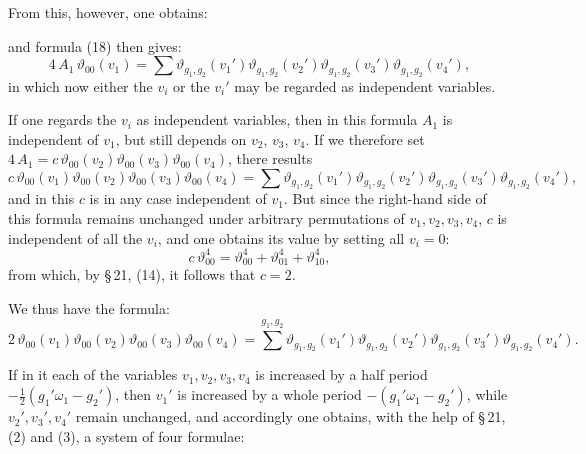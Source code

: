 
From this, however, one obtains:


and formula (18) then gives:
\[
4\,A_1\,\vartheta_{00}(v_1) = \sum \vartheta_{g_1,g_2}(v_1')\vartheta_{g_1,g_2}(v_2')\vartheta_{g_1,g_2}(v_3')\vartheta_{g_1,g_2}(v_4'),
\]
in which now either the $v_i$ or the $v_i'$ may be regarded as independent variables.

If one regards the $v_i$ as independent variables, then in this formula $A_1$ is independent of $v_1$, but still depends on $v_2$, $v_3$, $v_4$. If we therefore set $4\,A_1 = c\,\vartheta_{00}(v_2)\vartheta_{00}(v_3)\vartheta_{00}(v_4)$, there results
\[
c\,\vartheta_{00}(v_1)\vartheta_{00}(v_2)\vartheta_{00}(v_3)\vartheta_{00}(v_4)
= \sum \vartheta_{g_1,g_2}(v_1')\vartheta_{g_1,g_2}(v_2')\vartheta_{g_1,g_2}(v_3')\vartheta_{g_1,g_2}(v_4'),
\]
and in this $c$ is in any case independent of $v_1$. But since the right-hand side of this formula remains unchanged under arbitrary permutations of $v_1, v_2, v_3, v_4$, $c$ is independent of all the $v_i$, and one obtains its value by setting all $v_i = 0$:
\[
c\,\vartheta_{00}^4 = \vartheta_{00}^4 + \vartheta_{01}^4 + \vartheta_{10}^4,
\]
from which, by \S\,21, (14), it follows that $c=2$.

We thus have the formula:
\[
2\,\vartheta_{00}(v_1)\vartheta_{00}(v_2)\vartheta_{00}(v_3)\vartheta_{00}(v_4)
= \sum\limits^{g_1,g_2} \vartheta_{g_1,g_2}(v_1')\vartheta_{g_1,g_2}(v_2')\vartheta_{g_1,g_2}(v_3')\vartheta_{g_1,g_2}(v_4').
\]

If in it each of the variables $v_1, v_2, v_3, v_4$ is increased by a half period $-\tfrac{1}{2}(g_1'\omega_1 - g_2')$, then $v_1'$ is increased by a whole period $-(g_1'\omega_1 - g_2')$, while $v_2', v_3', v_4'$ remain unchanged, and accordingly one obtains, with the help of \S\,21, (2) and (3), a system of four formulae:

